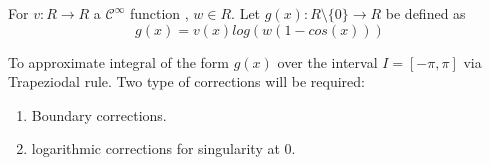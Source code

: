 \documentclass[../document.tex]{subfiles}
\begin{document}
	
	
	

\pagebreak
For $v:R\rightarrow R$  a $\mathcal{C}^{\infty}$ function , $w \in R$.
Let $g(x):R\setminus\{0\} \rightarrow R$ be defined as
\begin{equation}
	g(x) = v(x) log(w( 1 - cos(x) ))
\end{equation}


To approximate integral of the form $g(x)$ over the interval  
$I = [-\pi,\pi]$ via Trapeziodal rule. Two type of corrections will be required:
\begin{enumerate}
	\item Boundary corrections.
	\item logarithmic corrections for singularity at 0.
\end{enumerate}





	
	
	
	
	
	
	
	
	
	
	
	
\end{document}
